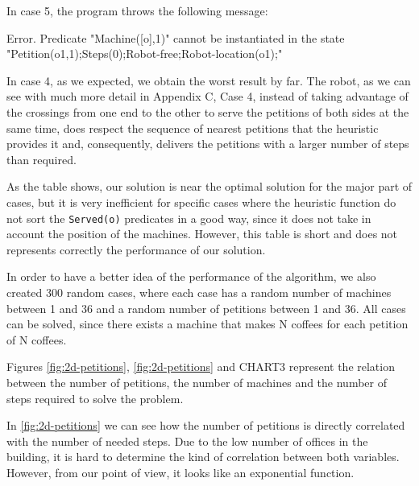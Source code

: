 \documentclass[12pt,a4paper,oneside]{article}
\numberwithin{equation}{section}
\numberwithin{equation}{section}
\theoremstyle{definition}
\begin{document}
\newcommand{\plottwodee}[1]{
	\begin{tikzpicture}
		\begin{axis}[
				xlabel={#1},
				ylabel=Steps,
			]
			\addplot[
				scatter,
				only marks,
			]
			table[
				x=#1,
				y=Steps,
				col sep=comma,
			]{results.csv};
		\end{axis}		
	\end{tikzpicture}
}

In case 5, the program throws the following message:
\begin{listing}[style=consola, numbers=none]
Error. Predicate "Machine([o],1)" cannot be instantiated in the state "Petition(o1,1);Steps(0);Robot-free;Robot-location(o1);"
\end{listing}

In case 4, as we expected, we obtain the worst result by far. The robot, as we can see with much more detail in Appendix C, Case 4, instead of taking advantage of the crossings from one end to the other to serve the petitions of both sides at the same time, does respect the sequence of nearest petitions that the heuristic provides it and, consequently, delivers the petitions with a larger number of steps than required.


As the table shows, our solution is near the optimal solution for the major part of cases, but it is very inefficient for specific cases where the heuristic function do not sort the \texttt{Served(o)} predicates in a good way, since it does not take in account the position of the machines. However, this table is short and does not represents correctly the performance of our solution.


In order to have a better idea of the performance of the algorithm, we also created 300 random cases, where each case has a random number of machines between 1 and 36 and a random number of petitions between 1 and 36. All cases can be solved, since there exists a machine that makes N coffees for each petition of N coffees.

Figures \ref{fig:2d-petitions}, \ref{fig:2d-petitions} and CHART3 represent the relation between the number of petitions, the number of machines and the number of steps required to solve the problem.

In \ref{fig:2d-petitions} we can see how the number of petitions is directly correlated with the number of needed steps. Due to the low number of offices in the building, it is hard to determine the kind of correlation between both variables. However, from our point of view, it looks like an exponential function.
	
\end{document}
